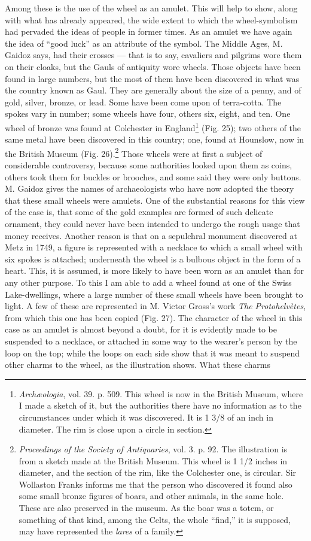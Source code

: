 \documentclass[a4paper, 11pt, oneside, polutonikogreek, english]{article}
\begin{document}
Among these is the use of the wheel as an amulet. This will help to show, along with what has already appeared, the wide extent to which the wheel-symbolism had pervaded the ideas of people in former times. As an amulet we have again the idea of ``good luck'' as an attribute of the symbol. The Middle Ages, M. Gaidoz says, had their crosses --- that is to say, cavaliers and pilgrims wore them on their cloaks, but the Gauls of antiquity wore wheels. Those objects have been found in large numbers, but the most of them have been discovered in what was the country known as Gaul. They are generally about the size of a penny, and of gold, silver, bronze, or lead. Some have been come upon of terra-cotta. The spokes vary in number; some wheels have four, others six, eight, and ten. One wheel of bronze was found at Colchester in England\footnote{\emph{Archæologia}, vol. 39. p. 509. This wheel is now in the British Museum, where I made a sketch of it, but the authorities there have no information as to the circumstances under which it was discovered. It is 1 3/8 of an inch in diameter. The rim is close upon a circle in section.} (Fig. 25); two others of the same metal have been discovered in this country; one, found at Hounslow, now in the British Museum (Fig. 26).\footnote{\emph{Proceedings of the Society of Antiquaries}, vol. 3. p. 92. The illustration is from a sketch made at the British Museum. This wheel is 1 1/2 inches in diameter, and the section of the rim, like the Colchester one, is circular. Sir Wollaston Franks informs me that the person who discovered it found also some small bronze figures of boars, and other animals, in the same hole. These are also preserved in the museum. As the boar was a totem, or something of that kind, among the Celts, the whole ``find,'' it is supposed, may have represented the \emph{lares} of a family.} Those wheels were at first a subject of considerable controversy, because some authorities looked upon them as coins, others took them for buckles or brooches, and some said they were only buttons. M. Gaidoz gives the names of archaeologists who have now adopted the theory that these small wheels were amulets. One of the substantial reasons for this view of the case is, that some of the gold examples are formed of such delicate ornament, they could never have been intended to undergo the rough usage that money receives. Another reason is that on a sepulchral monument discovered at Metz in 1749, a figure is represented with a necklace to which a small wheel with six spokes is attached; underneath the wheel is a bulbous object in the form of a heart. This, it is assumed, is more likely to have been worn as an amulet than for any other purpose. To this I am able to add a wheel found at one of the Swiss Lake-dwellings, where a large number of these small wheels have been brought to light. A few of these are represented in M. Victor Gross's work \emph{The Protohelvètes}, from which this one has been copied (Fig. 27). The character of the wheel in this case as an amulet is almost beyond a doubt, for it is evidently made to be suspended to a necklace, or attached in some way to the wearer's person by the loop on the top; while the loops on each side show that it was meant to suspend other charms to the wheel, as the illustration shows. What these charms 
\end{document}
